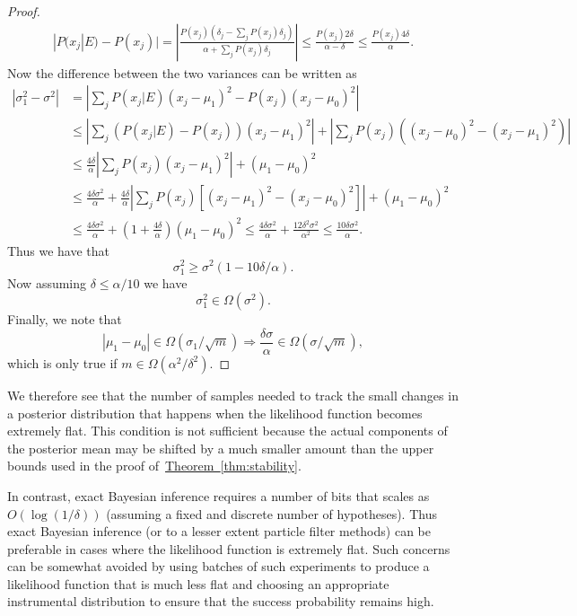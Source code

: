 \documentclass[aps,pra,amsmath,twocolumn,amssymb,superscriptaddress]{revtex4-1}
\newcommand{\thm}[1]{\hyperref[thm:#1]{Theorem~\ref*{thm:#1}}}
\begin{document}
\begin{proof}
\begin{align}
|P(x_j|E)-P(x_j)| = \left|\frac{P(x_j)(\delta_j-\sum_jP(x_j)\delta_j)}{\alpha+\sum_j P(x_j)\delta_j}\right|\le \frac{P(x_j) 2\delta}{\alpha-\delta}\le \frac{P(x_j) 4\delta}{\alpha}.
\end{align}
Now the difference between the two variances can be written as
\begin{align}
|\sigma_1^2-\sigma^2| &= \left|\sum_j  P(x_j|E)(x_j-\mu_1)^2-P(x_j)(x_j-\mu_0)^2\right|\nonumber\\
 &\le \left|\sum_j  (P(x_j|E)-P(x_j))(x_j-\mu_1)^2\right|+\left|\sum_j P(x_j)\left((x_j-\mu_0)^2-(x_j-\mu_1)^2\right)\right|\nonumber\\
 &\le  \frac{4\delta}{\alpha}\left|\sum_j  P(x_j)(x_j-\mu_1)^2\right|+(\mu_1-\mu_0)^2\nonumber\\
&\le \frac{4\delta\sigma^2}{\alpha}+\frac{4\delta}{\alpha}\left|\sum_j P(x_j)[(x_j-\mu_1)^2-(x_j-\mu_0)^2]  \right|+(\mu_1-\mu_0)^2\nonumber\\
&\le \frac{4\delta\sigma^2}{\alpha}+(1+\frac{4\delta}{\alpha})(\mu_1-\mu_0)^2\le \frac{4\delta\sigma^2}{\alpha}+ \frac{12\delta^2\sigma^2}{\alpha^2}\le \frac{10\delta\sigma^2}{\alpha}.
\end{align}
Thus we have that
\begin{equation}
\sigma_1^2 \ge \sigma^2(1-10\delta/\alpha).
\end{equation}
Now assuming $\delta\le \alpha/10$ we have 
\begin{equation}
\sigma_1^2\in \Omega(\sigma^2).
\end{equation}
Finally, we note that
\begin{equation}
|\mu_1-\mu_0| \in \Omega(\sigma_1/\sqrt{m}) \Rightarrow \frac{\delta \sigma}{\alpha} \in \Omega(\sigma/\sqrt{m}),
\end{equation}
which is only true if $m\in \Omega(\alpha^2/\delta^2)$.
\end{proof}
We therefore see that the number of samples needed to track the small changes in a posterior distribution that happens when the likelihood function becomes extremely flat.  This condition is not sufficient because the actual components of the posterior mean may be shifted by a much smaller amount than the upper bounds used in the proof of~\thm{stability}.

In contrast, exact Bayesian inference requires a number of bits that scales as $O(\log(1/\delta))$ (assuming a fixed and discrete number of hypotheses).  Thus exact Bayesian inference (or to a lesser extent particle filter methods) can be preferable in cases where the likelihood function is extremely flat.  Such concerns can be somewhat  avoided by using batches of such experiments to produce a likelihood function that is much less flat and choosing an appropriate instrumental distribution to ensure that the success probability remains high.
\end{document}

